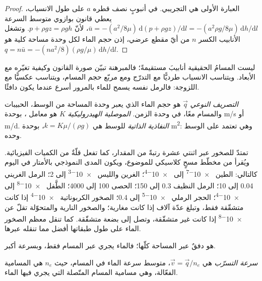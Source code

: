 \begin{proof}
العبارة الأولى هي  التجريبي. في أنبوبٍ نصف قطره $a$
على طول الانسياب، يعطي قانون بوازوي متوسط السرعة $\bar u =
-(a^2/8\mu)\,\mathrm d(p + \rho gz)/\mathrm dl = -(a^2\rho g/8\mu)\,\mathrm
dh/\mathrm dl$، لأنّ $p + \rho gz = \rho g h$. وتشغل الأنابيب
الكسر $n$ من أيّ مقطع عرضي، إذن حجم الماء لكل وحدة مساحة كلية هو
$q = n\bar u = -(na^2/8)(\rho g/\mu)\,\mathrm dh/\mathrm dl$.
\end{proof}

ليست المسامُ الحقيقية أنابيبَ مستقيمةً؛ فالمبرهنة تبيّن صورة القانون
وكيفية تغيّره مع الأبعاد. ويتناسب الانسياب طرديًّا مع التدرّج ومع مربّع حجم
المسام، ويتناسب عكسيًّا مع اللزوجة: فالرمل نفسه يسمح للماء بالمرور أسرع
عندما يكون دافئًا.

\begin{definition}\label{def:b3:hydrogeology:darcy}
\emph{التصريف النوعي} $\vec q$ هو
حجم الماء الذي يعبر وحدة المساحة من الوسط، الحبيبات والمسام
معًا، في وحدة الزمن. \emph{الموصلية
الهيدروليكية} $K$ هو معامل
، بوحدة \unit{m/s} أو \unit{m/d}. \emph{النفاذية
الذاتية} للوسط هي $k =
K\mu/(\rho g)$، بوحدة \unit{m^2}: وهي تعتمد على الوسط وحده.
\end{definition}

تمتدّ  للصخور عبر اثنتي عشرة رتبةً من
المقدار، كما تفعل قلّةٌ من الكميات الفيزيائية. ويُقرأ من مخطّط مسحٍ كلاسيكي
للموضوع، ويكون المدى النموذجي بالأمتار في اليوم كالتالي: الطين
\num{e-7} إلى \num{e-4}؛ الغرين والليس \num{e-3} إلى 2؛ الرمل الغريني 0.04 إلى
10؛ الرمل النظيف 0.3 إلى 150؛ الحصى 100 إلى 4000؛ الطَّفل \num{e-8} إلى
\num{e-4}؛ الحجر الرملي \num{e-5} إلى 0.4؛ الصخور الكربوناتية \num{e-4} إذا كانت
متشقّقة فقط، وتبلغ عدّة آلاف إذا كانت مغارية؛ والصخور النارية
والمتحوّلة تقلّ عن \num{e-8} إذا كانت غير متشقّقة، وتصل إلى بضعة
متشقّقة. كما تنقل معظم الصخور الماء على طول طبقاتها أفضل مما
تنقله عبرها.

 هو دفقٌ عبر المساحة كلّها؛ فالماء يجري
عبر المسام فقط، وبسرعة أكبر.

\begin{definition}\label{def:b3:hydrogeology:seepage}
\emph{سرعة التسرّب} هي $\vec v = \vec
q/n_e$، متوسط سرعة الماء في المسام، حيث $n_e$ هي
المسامية الفعّالة، وهي مسامية المسام المتّصلة التي يجري فيها
الماء.
\end{definition}

